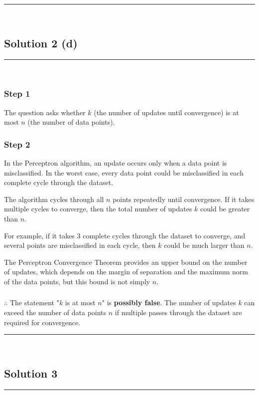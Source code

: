\documentclass{article}
\begin{document}
\noindent\rule{\textwidth}{0.4pt}\\

\newpage

\subsection*{Solution 2 (d)}
\noindent\rule{\textwidth}{0.4pt}\\

\subsubsection*{Step 1}
\parbox{\textwidth}{
The question asks whether $k$ (the number of updates until convergence) is at most $n$ (the number of data points).
}

\subsubsection*{Step 2}
\parbox{\textwidth}{
In the Perceptron algorithm, an update occurs only when a data point is misclassified. In the worst case, every data point could be misclassified in each complete cycle through the dataset.

The algorithm cycles through all $n$ points repeatedly until convergence. If it takes multiple cycles to converge, then the total number of updates $k$ could be greater than $n$.

For example, if it takes 3 complete cycles through the dataset to converge, and several points are misclassified in each cycle, then $k$ could be much larger than $n$.

The Perceptron Convergence Theorem provides an upper bound on the number of updates, which depends on the margin of separation and the maximum norm of the data points, but this bound is not simply $n$.
}

\subsubsection*{\normalfont}{$\therefore$ The statement "$k$ is at most $n$" is \textbf{possibly false}. The number of updates $k$ can exceed the number of data points $n$ if multiple passes through the dataset are required for convergence.}

\noindent\rule{\textwidth}{0.4pt}\\

\newpage

\subsection*{Solution 3}
\noindent\rule{\textwidth}{0.4pt}\\
\end{document}
